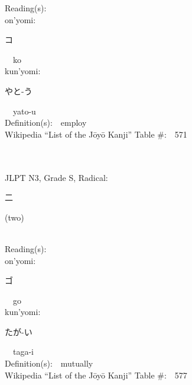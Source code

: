 \begin{multicols}{2}
Reading(s):\ \ \\
{\hspace*{1em}}on'yomi:\ \ \\
{\hspace*{2em}}{\begin{CJK}{UTF8}{min} コ \end{CJK}}\ \ ko\ \ \\
{\hspace*{1em}}kun'yomi:\ \ \\
{\hspace*{2em}}{\begin{CJK}{UTF8}{min} やと-う \end{CJK}}\ \ yato-u\ \ \\
Definition(s):\ \ employ \\
Wikipedia ``List of the J\=oy\=o Kanji'' Table \#:\ \ 571 \\
\ \ \\
{\fontsize{34pt}{40pt}  }\ \ \\  %
{JLPT N3, Grade S, Radical:\ \ {\begin{CJK}{UTF8}{min} 二 \end{CJK}} (two) } \\
Reading(s):\ \ \\
{\hspace*{1em}}on'yomi:\ \ \\
{\hspace*{2em}}{\begin{CJK}{UTF8}{min} ゴ \end{CJK}}\ \ go\ \ \\
{\hspace*{1em}}kun'yomi:\ \ \\
{\hspace*{2em}}{\begin{CJK}{UTF8}{min} たが-い \end{CJK}}\ \ taga-i\ \ \\
Definition(s):\ \ mutually \\
Wikipedia ``List of the J\=oy\=o Kanji'' Table \#:\ \ 577 \\
\ \ \\
{\fontsize{34pt}{40pt}  }\ \ \\  %

\end{multicols}

